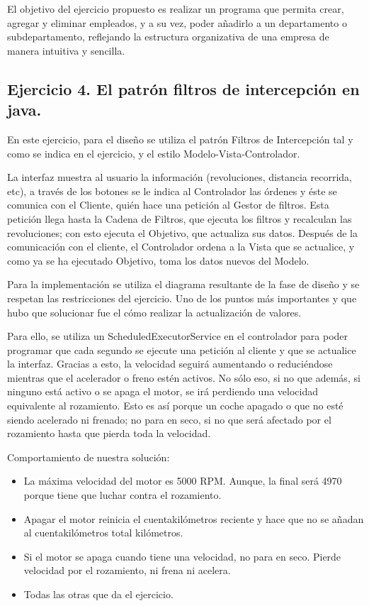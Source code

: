 \documentclass[
]{article}
\begin{document}
El objetivo del ejercicio propuesto es realizar un programa que permita crear, agregar y eliminar empleados, y a su vez, poder añadirlo a un departamento o subdepartamento, reflejando la estructura organizativa de una empresa de manera intuitiva y sencilla.

\subsection{\texorpdfstring{\textbf{Ejercicio 4. El patrón filtros de
intercepción en
java.}}{Ejercicio 4. El patrón filtros de intercepción en java.}}\label{ejercicio-4.-el-patruxf3n-filtros-de-intercepciuxf3n-en-java.}

En este ejercicio, para el diseño se utiliza el patrón Filtros de
Intercepción tal y como se indica en el ejercicio, y el estilo
Modelo-Vista-Controlador.

La interfaz muestra al usuario la información (revoluciones, distancia
recorrida, etc), a través de los botones se le indica al Controlador las
órdenes y éste se comunica con el Cliente, quién hace una petición al
Gestor de filtros. Esta petición llega hasta la Cadena de Filtros, que
ejecuta los filtros y recalculan las revoluciones; con esto ejecuta el
Objetivo, que actualiza sus datos. Después de la comunicación con el
cliente, el Controlador ordena a la Vista que se actualice, y como ya se
ha ejecutado Objetivo, toma los datos nuevos del Modelo.

Para la implementación se utiliza el diagrama resultante de la fase de
diseño y se respetan las restricciones del ejercicio. Uno de los puntos
más importantes y que hubo que solucionar fue el cómo realizar la
actualización de valores.

Para ello, se utiliza un ScheduledExecutorService en el controlador para
poder programar que cada segundo se ejecute una petición al cliente y
que se actualice la interfaz. Gracias a esto, la velocidad seguirá
aumentando o reduciéndose mientras que el acelerador o freno estén
activos. No sólo eso, si no que además, si ninguno está activo o se
apaga el motor, se irá perdiendo una velocidad equivalente al
rozamiento. Esto es así porque un coche apagado o que no esté siendo
acelerado ni frenado; no para en seco, si no que será afectado por el
rozamiento hasta que pierda toda la velocidad.

Comportamiento de nuestra solución:

\begin{itemize}
\item
  La máxima velocidad del motor es 5000 RPM. Aunque, la final será 4970
  porque tiene que luchar contra el rozamiento.
\item
  Apagar el motor reinicia el cuentakilómetros reciente y hace que no se
  añadan al cuentakilómetros total kilómetros.
\item
  Si el motor se apaga cuando tiene una velocidad, no para en seco.
  Pierde velocidad por el rozamiento, ni frena ni acelera.
\item
  Todas las otras que da el ejercicio.
\end{itemize}
\end{document}
